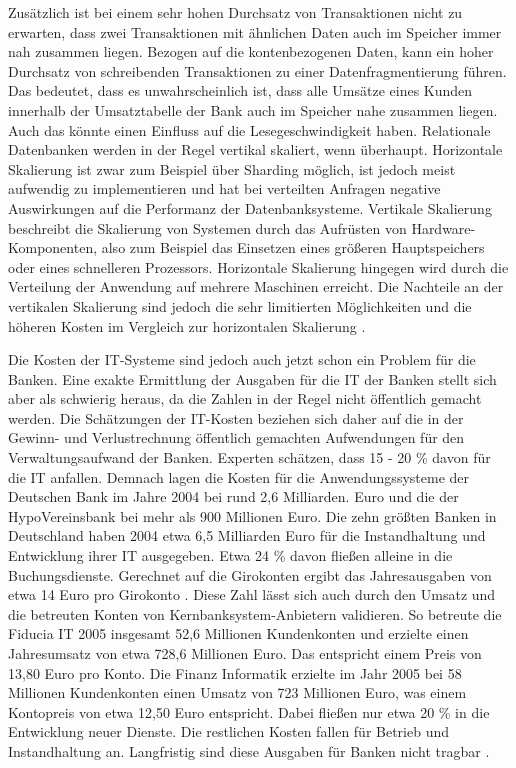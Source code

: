 \documentclass[12pt,oneside,a4paper,parskip]{scrbook}
\begin{document}
Zusätzlich ist bei einem sehr hohen Durchsatz von Transaktionen nicht zu erwarten, dass zwei Transaktionen mit ähnlichen Daten auch im Speicher immer nah zusammen liegen. Bezogen auf die kontenbezogenen Daten, kann ein hoher Durchsatz von schreibenden Transaktionen zu einer Datenfragmentierung führen. Das bedeutet, dass es unwahrscheinlich ist, dass alle Umsätze eines Kunden innerhalb der Umsatztabelle der Bank auch im Speicher nahe zusammen liegen. Auch das könnte einen Einfluss auf die Lesegeschwindigkeit haben. Relationale Datenbanken werden in der Regel vertikal skaliert, wenn überhaupt. Horizontale Skalierung ist zwar zum Beispiel über Sharding möglich, ist jedoch meist aufwendig zu implementieren und hat bei verteilten Anfragen negative Auswirkungen auf die Performanz der Datenbanksysteme. Vertikale Skalierung beschreibt die Skalierung von Systemen durch das Aufrüsten von Hardware-Komponenten, also zum Beispiel das Einsetzen eines größeren Hauptspeichers oder eines schnelleren Prozessors. Horizontale Skalierung hingegen wird durch die Verteilung der Anwendung auf mehrere Maschinen erreicht. Die Nachteile an der vertikalen Skalierung sind jedoch die sehr limitierten Möglichkeiten und die höheren Kosten im Vergleich zur horizontalen Skalierung \cite{sharding}\cite{rdbmssuck}. 

Die Kosten der IT-Systeme sind jedoch auch jetzt schon ein Problem für die Banken. Eine exakte Ermittlung der Ausgaben für die IT der Banken stellt sich aber als schwierig heraus, da die Zahlen in der Regel nicht öffentlich gemacht werden. Die Schätzungen der IT-Kosten beziehen sich daher auf die in der Gewinn- und Verlustrechnung öffentlich gemachten Aufwendungen für den Verwaltungsaufwand der Banken. Experten schätzen, dass 15 - 20 \% davon für die IT anfallen. Demnach lagen die Kosten für die Anwendungssysteme der Deutschen Bank im Jahre 2004 bei rund 2,6 Milliarden. Euro und die der HypoVereinsbank bei mehr als 900 Millionen Euro. Die zehn größten Banken in Deutschland haben 2004 etwa 6,5 Milliarden Euro für die Instandhaltung und Entwicklung ihrer IT ausgegeben. 
Etwa 24 \% davon fließen alleine in die Buchungsdienste. Gerechnet auf die Girokonten ergibt das Jahresausgaben von etwa 14 Euro pro Girokonto \cite[29-39]{ITidF}. Diese Zahl lässt sich auch durch den Umsatz und die betreuten Konten von Kernbanksystem-Anbietern validieren. So betreute die Fiducia IT 2005 insgesamt 52,6 Millionen Kundenkonten und erzielte einen Jahresumsatz von etwa 728,6 Millionen Euro. Das entspricht einem Preis von 13,80 Euro pro Konto. Die Finanz Informatik erzielte im Jahr 2005 bei 58 Millionen Kundenkonten einen Umsatz von 723 Millionen Euro, was einem Kontopreis von etwa 12,50 Euro entspricht. Dabei fließen nur etwa 20 \% in die Entwicklung neuer Dienste. Die restlichen Kosten fallen für Betrieb und Instandhaltung an. Langfristig sind diese Ausgaben für Banken nicht tragbar \cite[75-91]{ITidF}\cite{SuPdIiB}\cite[41-42]{DdF}\cite{bankingsCosts}. 
\end{document}
